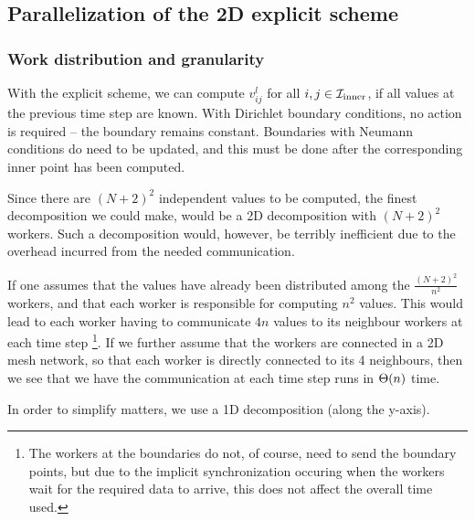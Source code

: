 \subsection{Parallelization of the 2D explicit scheme}
\subsubsection{Work distribution and granularity}
\cite{inf3380_bok}
With the explicit scheme, we can compute $v_{ij}^l$ for all $i, j \in \mathcal{I}_{\mathrm{inner}}$, if all values at the previous time step are known. With Dirichlet boundary conditions, no action is required -- the boundary remains constant. Boundaries with Neumann conditions do need to be updated, and this must be done after the corresponding inner point has been computed.

Since there are $(N+2)^2$ independent values to be computed, the finest decomposition we could make, would be a 2D decomposition with $(N+2)^2$ workers. Such a decomposition would, however, be terribly inefficient due to the overhead incurred from the needed communication.

If one assumes that the values have already been distributed among the $\frac{(N+2)^2}{n^2}$ workers, and that each worker is responsible for computing $n^2$ values. This would lead to each worker having to communicate $4n$ values to its neighbour workers at each time step \footnote{The workers at the boundaries do not, of course, need to send the boundary points, but due to the implicit synchronization occuring when the workers wait for the required data to arrive, this does not affect the overall time used.}. 
If we further assume that the workers are connected in a 2D mesh network, so that each worker is directly connected to its 4 neighbours, then we see that we have the communication at each time step runs in $\Theta (n)$ time.

In order to simplify matters, we use a 1D decomposition (along the y-axis).
